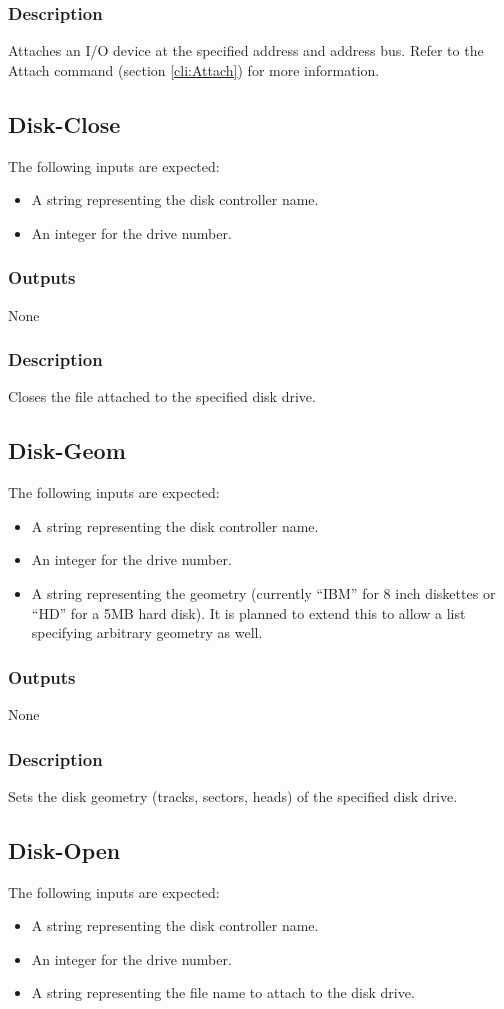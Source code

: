 \documentclass[10pt, openany]{book}
\begin{document}
\subsubsection{Description}
Attaches an I/O device at the specified address and address bus.  Refer to the Attach command (section \ref{cli:Attach}) for more information.

\subsection{Disk-Close}
The following inputs are expected:
\begin{itemize}
  \item A string representing the disk controller name.
  \item An integer for the drive number.
\end{itemize}
\subsubsection{Outputs}
None
\subsubsection{Description}
Closes the file attached to the specified disk drive.

\subsection{Disk-Geom}
The following inputs are expected:
\begin{itemize}
  \item A string representing the disk controller name.
  \item An integer for the drive number.
  \item A string representing the geometry (currently ``IBM'' for 8 inch diskettes or ``HD'' for a 5MB hard disk).  It is planned to extend this to allow a list specifying arbitrary geometry as well.
\end{itemize}
\subsubsection{Outputs}
None
\subsubsection{Description}
Sets the disk geometry (tracks, sectors, heads) of the specified disk drive.

\subsection{Disk-Open}
The following inputs are expected:
\begin{itemize}
  \item A string representing the disk controller name.
  \item An integer for the drive number.
  \item A string representing the file name to attach to the disk drive.
\end{itemize}
\end{document}
